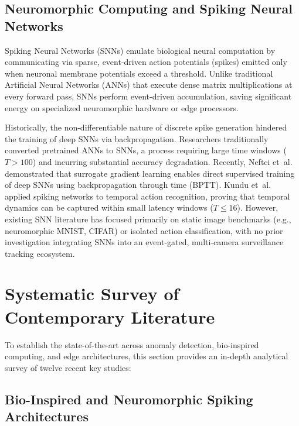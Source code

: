 \documentclass[12pt,a4paper]{report}
\begin{document}
\subsection{Neuromorphic Computing and Spiking Neural Networks}
Spiking Neural Networks (SNNs) emulate biological neural computation by communicating via sparse, event-driven action potentials (spikes) emitted only when neuronal membrane potentials exceed a threshold. Unlike traditional Artificial Neural Networks (ANNs) that execute dense matrix multiplications at every forward pass, SNNs perform event-driven accumulation, saving significant energy on specialized neuromorphic hardware or edge processors.

Historically, the non-differentiable nature of discrete spike generation hindered the training of deep SNNs via backpropagation. Researchers traditionally converted pretrained ANNs to SNNs, a process requiring large time windows ($T > 100$) and incurring substantial accuracy degradation. Recently, Neftci et~al.~\cite{ref_neftci2019_surrogate} demonstrated that surrogate gradient learning enables direct supervised training of deep SNNs using backpropagation through time (BPTT). Kundu et~al.~\cite{ref_kundu2021_spikin} applied spiking networks to temporal action recognition, proving that temporal dynamics can be captured within small latency windows ($T \le 16$). However, existing SNN literature has focused primarily on static image benchmarks (e.g., neuromorphic MNIST, CIFAR) or isolated action classification, with no prior investigation integrating SNNs into an event-gated, multi-camera surveillance tracking ecosystem.

\section{Systematic Survey of Contemporary Literature}
To establish the state-of-the-art across anomaly detection, bio-inspired computing, and edge architectures, this section provides an in-depth analytical survey of twelve recent key studies:

\subsection{Bio-Inspired and Neuromorphic Spiking Architectures}
\end{document}
